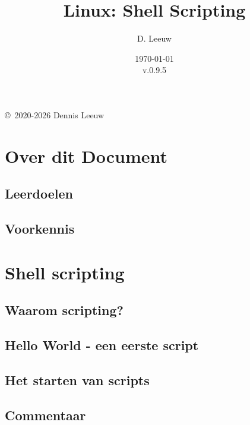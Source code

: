 \documentclass[a4paper,12pt,twoside,openright,titlepage]{book}
\author{D. Leeuw}
\title{Linux: Shell Scripting}
\date{\today\\v.0.9.5}
\begin{document}

\maketitle

\copyright\ 2020-2026 Dennis Leeuw\\




\frontmatter
\chapter{Over dit Document}
\section{Leerdoelen}

\section{Voorkennis}

%
%

\tableofcontents

\mainmatter

\chapter{Shell scripting}

\section{Waarom scripting?}

\section{Hello World - een eerste script}

\section{Het starten van scripts}

\section{Commentaar}

\end{document}
